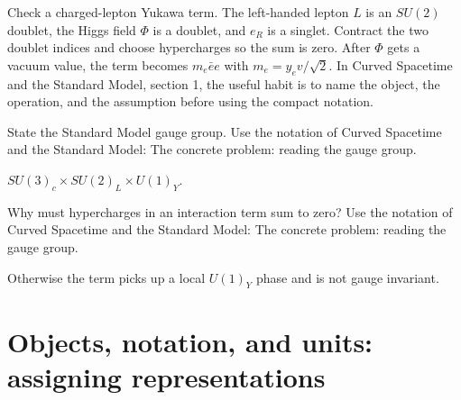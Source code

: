 \begin{example}
Check a charged-lepton Yukawa term.  The left-handed lepton \(L\) is an \(SU(2)\) doublet, the Higgs field \(\Phi\) is a doublet, and \(e_R\) is a singlet.  Contract the two doublet indices and choose hypercharges so the sum is zero.  After \(\Phi\) gets a vacuum value, the term becomes \(m_e\bar e e\) with \(m_e=y_ev/\sqrt2\).  In Curved Spacetime and the Standard Model, section 1, the useful habit is to name the object, the operation, and the assumption before using the compact notation.
\end{example}



\begin{exercise}
State the Standard Model gauge group.  Use the notation of Curved Spacetime and the Standard Model: The concrete problem: reading the gauge group.
\begin{answer}
\(SU(3)_c\times SU(2)_L\times U(1)_Y\).
\end{answer}
\end{exercise}

\begin{exercise}
Why must hypercharges in an interaction term sum to zero?  Use the notation of Curved Spacetime and the Standard Model: The concrete problem: reading the gauge group.
\begin{answer}
Otherwise the term picks up a local \(U(1)_Y\) phase and is not gauge invariant.
\end{answer}
\end{exercise}



\section{Objects, notation, and units: assigning representations}













